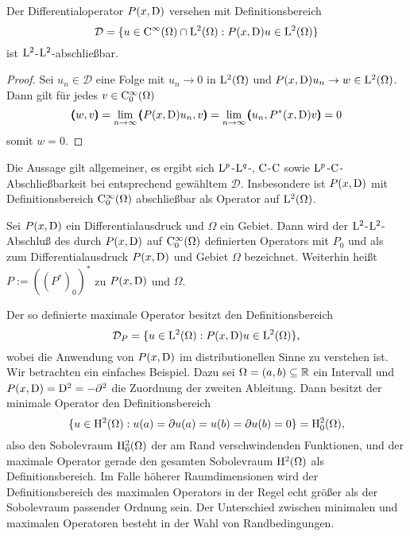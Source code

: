 \begin{lem}
Der Differentialoperator  $P(x,\mathrm D)$ versehen mit Definitionsbereich
\begin{equation}
  \mathcal D= \{ u\in\mathrm C^\infty(\Omega) \cap \mathrm L^2(\Omega) :   P(x,\mathrm D)u\in\mathrm L^2(\Omega) \}
\end{equation}
ist $\mathrm L^2$-$\mathrm L^2$-abschließbar.
\end{lem}
\begin{proof}
Sei $u_n\in\mathcal D$ eine Folge mit $u_n\to 0$ in $\mathrm L^2(\Omega)$ und $P(x,\mathrm D) u_n \to w\in\mathrm L^2(\Omega)$. Dann gilt f\"ur jedes 
$v\in\mathrm C^\infty_0(\Omega)$
\begin{equation}
 \pmb(w,v\pmb)=\lim_{n\to\infty}   \pmb( P(x,\mathrm D) u_n,v\pmb) = \lim_{n\to\infty} \pmb(u_n,P^*(x,\mathrm D)v\pmb) = 0
\end{equation}
somit $w=0$.
\end{proof}

Die Aussage gilt allgemeiner, es ergibt sich $\mathrm L^p$-$\mathrm L^q$-, $\mathrm C$-$\mathrm C$ sowie $\mathrm L^p$-$\mathrm C$-Abschließbarkeit bei entsprechend gewähltem $\mathcal D$. Insbesondere ist $P(x,\mathrm D)$ mit Definitionsbereich $\mathrm C^\infty_0(\Omega)$ abschließbar als Operator auf $\mathrm L^2(\Omega)$. 

\begin{df} 
Sei $P(x,\mathrm D)$ ein Differentialausdruck und $\Omega$ ein Gebiet. Dann wird der $\mathrm L^2$-$\mathrm L^2$-Abschluß des durch  $P(x,\mathrm D)$ auf $\mathrm C_0^\infty(\Omega)$ definierten Operators mit $P_0$ und als  zum Differentialausdruck $P(x,\mathrm D)$ und Gebiet $\Omega$ bezeichnet. 
Weiterhin heißt $P := (  (P^*)_0)^*$  zu $P(x,\mathrm D)$ und $\Omega$.
\end{df}

Der so definierte maximale Operator besitzt den Definitionsbereich
\begin{equation}
   \mathcal D_P = \{ u\in\mathrm L^2(\Omega) :  P(x,\mathrm D)u \in\mathrm L^2(\Omega)\},
\end{equation}
wobei die Anwendung von $P(x,\mathrm D)$ im distributionellen Sinne zu verstehen ist. Wir betrachten ein einfaches Beispiel. Dazu sei $\Omega=(a,b)\subseteq\mathbb R$ ein Intervall und $P(x,\mathrm D) = \mathrm D^2 = - \partial^2$ die Zuordnung der zweiten Ableitung. Dann besitzt der minimale Operator den Definitionsbereich
\begin{equation}
    \{ u\in\mathrm H^2(\Omega) :  u(a)=\partial u(a)=u(b)=\partial u(b) = 0\} = \mathrm H^2_0(\Omega),
\end{equation}
also den Sobolevraum $\mathrm H^2_0(\Omega)$ der am Rand verschwindenden Funktionen, und der maximale Operator gerade den gesamten Sobolevraum $\mathrm H^2(\Omega)$ als Definitionsbereich. Im Falle h\"oherer Raumdimensionen wird der Definitionsbereich des maximalen Operators in der Regel echt größer als der Sobolevraum passender Ordnung sein.
Der Unterschied zwischen minimalen und maximalen Operatoren besteht in der Wahl von Randbedingungen. 

